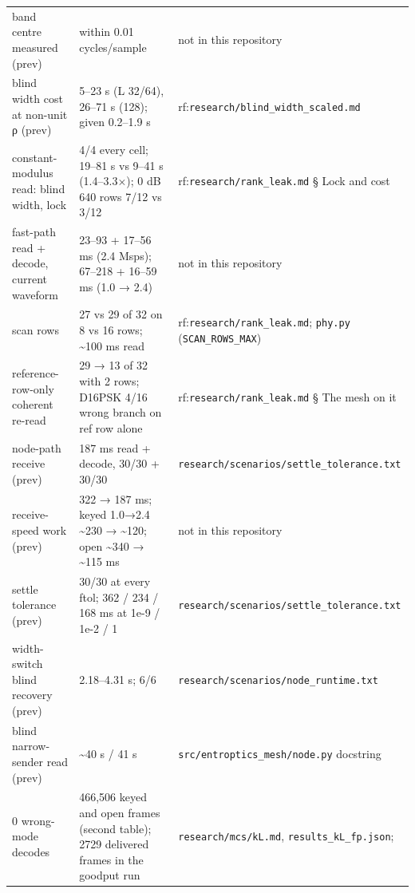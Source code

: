 \documentclass[10pt,letterpaper,twocolumn]{article}
\begin{document}
\begin{table}[tp]
\begin{tabular}{L{0.175\textwidth}L{0.545\textwidth}L{0.230\textwidth}}
band centre measured (prev) & within 0.01 cycles/sample & not in this repository \\
blind width cost at non-unit ρ (prev) & 5--23 s (L 32/64), 26--71 s (128); given 0.2--1.9 s & rf:\texttt{research/\allowbreak{}blind\_\allowbreak{}width\_\allowbreak{}scaled.\allowbreak{}md} \\
constant-modulus read: blind width, lock & 4/4 every cell; 19--81 s vs 9--41 s (1.4--3.3×); 0 dB 640 rows 7/12 vs
3/12 & rf:\texttt{research/\allowbreak{}rank\_\allowbreak{}leak.\allowbreak{}md}
§ Lock and cost \\
fast-path read + decode, current waveform & 23--93 + 17--56 ms (2.4 Msps); 67--218 + 16--59 ms (1.0 → 2.4) & not in this repository \\
scan rows & 27 vs 29 of 32 on 8 vs 16 rows; \textasciitilde100 ms read & rf:\texttt{research/\allowbreak{}rank\_\allowbreak{}leak.\allowbreak{}md};
\texttt{phy.\allowbreak{}py}
(\texttt{SCAN\_\allowbreak{}ROWS\_\allowbreak{}MAX}) \\
reference-row-only coherent re-read & 29 → 13 of 32 with 2 rows; D16PSK 4/16 wrong branch on ref row alone & rf:\texttt{research/\allowbreak{}rank\_\allowbreak{}leak.\allowbreak{}md}
§ The mesh on it \\
node-path receive (prev) & 187 ms read + decode, 30/30 + 30/30 & \texttt{research/\allowbreak{}scenarios/\allowbreak{}settle\_\allowbreak{}tolerance.\allowbreak{}txt} \\
receive-speed work (prev) & 322 → 187 ms; keyed 1.0→2.4 \textasciitilde230 → \textasciitilde120;
open \textasciitilde340 → \textasciitilde115 ms & not in this repository \\
settle tolerance (prev) & 30/30 at every ftol; 362 / 234 / 168 ms at 1e-9 / 1e-2 / 1 & \texttt{research/\allowbreak{}scenarios/\allowbreak{}settle\_\allowbreak{}tolerance.\allowbreak{}txt} \\
width-switch blind recovery (prev) & 2.18--4.31 s; 6/6 & \texttt{research/\allowbreak{}scenarios/\allowbreak{}node\_\allowbreak{}runtime.\allowbreak{}txt} \\
blind narrow-sender read (prev) & \textasciitilde40 s / 41 s & \texttt{src/\allowbreak{}entroptics\_\allowbreak{}mesh/\allowbreak{}node.\allowbreak{}py}
docstring \\
0 wrong-mode decodes & 466,506 keyed and open frames (second table); 2729 delivered frames in
the goodput run & \texttt{research/\allowbreak{}mcs/\allowbreak{}kL.\allowbreak{}md},
\texttt{results\_\allowbreak{}kL\_\allowbreak{}fp.\allowbreak{}json};

\end{tabular}
\end{table}
\end{document}
